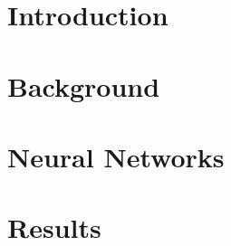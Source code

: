 


	
	\linenumbers
	\newpage
	\tableofcontents
	\newpage
	\section{Introduction}
	

	\section{Background}
	

	\section{Neural Networks}
	


	\newpage %
	\section{Results}
	

	\newpage
	
	

